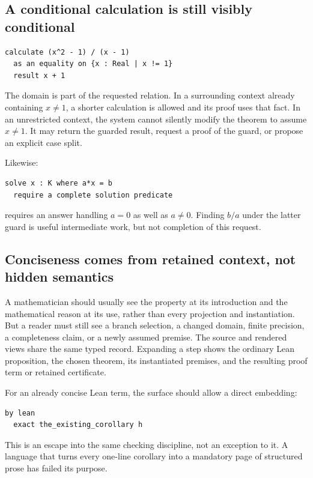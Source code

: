 \documentclass[11pt,a4paper]{article}
\theoremstyle{plain}
\theoremstyle{definition}
\begin{document}
\subsection{A conditional calculation is still visibly conditional}
\par\noindent\begin{minipage}{\linewidth}
\begin{lstlisting}
calculate (x^2 - 1) / (x - 1)
  as an equality on {x : Real | x != 1}
  result x + 1
\end{lstlisting}
\end{minipage}\par
The domain is part of the requested relation. In a surrounding context already containing $x\ne1$, a shorter calculation is allowed and its proof uses that fact. In an unrestricted context, the system cannot silently modify the theorem to assume $x\ne1$. It may return the guarded result, request a proof of the guard, or propose an explicit case split.

Likewise:
\par\noindent\begin{minipage}{\linewidth}
\begin{lstlisting}
solve x : K where a*x = b
  require a complete solution predicate
\end{lstlisting}
\end{minipage}\par
requires an answer handling $a=0$ as well as $a\ne0$. Finding $b/a$ under the latter guard is useful intermediate work, but not completion of this request.

\subsection{Conciseness comes from retained context, not hidden semantics}
A mathematician should usually see the property at its introduction and the mathematical reason at its use, rather than every projection and instantiation. But a reader must still see a branch selection, a changed domain, finite precision, a completeness claim, or a newly assumed premise. The source and rendered views share the same typed record. Expanding a step shows the ordinary Lean proposition, the chosen theorem, its instantiated premises, and the resulting proof term or retained certificate.

For an already concise Lean term, the surface should allow a direct embedding:
\par\noindent\begin{minipage}{\linewidth}
\begin{lstlisting}
by lean
  exact the_existing_corollary h
\end{lstlisting}
\end{minipage}\par
This is an escape into the same checking discipline, not an exception to it. A language that turns every one-line corollary into a mandatory page of structured prose has failed its purpose.
\end{document}

